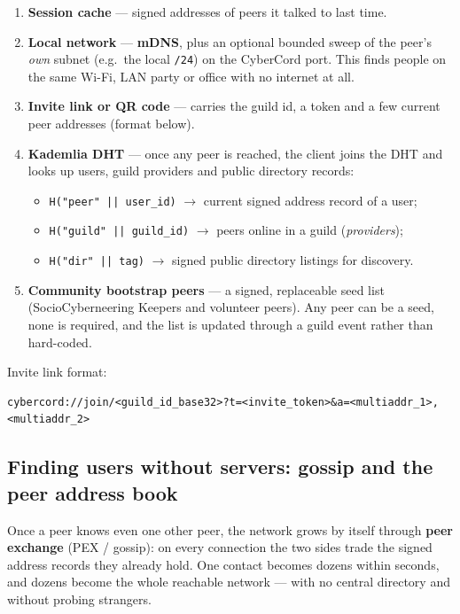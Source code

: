 \documentclass[11pt,a4paper]{article}
\begin{document}
\begin{enumerate}
  \item \textbf{Session cache} --- signed addresses of peers it talked to last time.
  \item \textbf{Local network} --- \textbf{mDNS}, plus an optional bounded sweep of the
        peer's \emph{own} subnet (e.g.\ the local \texttt{/24}) on the CyberCord port.
        This finds people on the same Wi-Fi, LAN party or office with no internet at all.
  \item \textbf{Invite link or QR code} --- carries the guild id, a token and a few current
        peer addresses (format below).
  \item \textbf{Kademlia DHT} --- once any peer is reached, the client joins the DHT and
        looks up users, guild providers and public directory records:
  \begin{itemize}
    \item \texttt{H("peer"\,||\,user\_id)} $\to$ current signed address record of a user;
    \item \texttt{H("guild"\,||\,guild\_id)} $\to$ peers online in a guild (\emph{providers});
    \item \texttt{H("dir"\,||\,tag)} $\to$ signed public directory listings for discovery.
  \end{itemize}
  \item \textbf{Community bootstrap peers} --- a signed, replaceable seed list
        (SocioCyberneering Keepers and volunteer peers). Any peer can be a seed, none is
        required, and the list is updated through a guild event rather than hard-coded.
\end{enumerate}

\noindent Invite link format:
\begin{lstlisting}[language={},numbers=none]
cybercord://join/<guild_id_base32>?t=<invite_token>&a=<multiaddr_1>,<multiaddr_2>
\end{lstlisting}

\subsection{Finding users without servers: gossip and the peer address book}
\label{sec:pex}

Once a peer knows even one other peer, the network grows by itself through
\textbf{peer exchange} (PEX / gossip): on every connection the two sides trade the signed
address records they already hold. One contact becomes dozens within seconds, and dozens
become the whole reachable network --- with no central directory and without probing
strangers.
\end{document}
